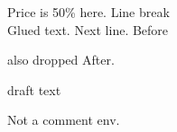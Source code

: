 \documentclass{article}
\begin{document}
Price is 50\% here. %
Line break\\%
Glued%
text.
Next line.
Before  also dropped
After.
\begin{draft}
draft text
\end{draft}
Not a comment env.
\end{document}
